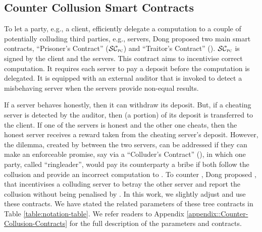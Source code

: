 \vspace{-3mm}

\subsection{Counter Collusion Smart Contracts}\label{Counter-Collusion-Smart-Contracts}
\vspace{-.5mm}

To let a party, e.g., a client, efficiently delegate a computation to a  couple of potentially colluding third parties, e.g., servers, Dong   \et \cite{dong2017betrayal} proposed two main smart contracts, ``Prisoner's Contract'' ($\SCpc$) and ``Traitor's Contract'' (\SCtc).  
%
$\SCpc$ is signed by the client and the servers. This contract aims to incentivise correct computation. It requires each server to pay a deposit before the computation is delegated. It is equipped with an external auditor that is invoked to detect a misbehaving server when the servers provide non-equal results. 



If a server behaves honestly, then it can withdraw its deposit. But, if a cheating server is detected by the auditor, then (a portion) of its deposit is transferred to the client. If one of the servers is honest and the other one cheats, then the honest server receives a reward taken from the cheating server's deposit. However, the dilemma, created by \SCpc between the two servers, can be addressed if they can make an enforceable promise, say via a ``Colluder's Contract'' (\SCcc),  in which one party, called ``ringleader'', would pay its counterparty a bribe if both follow the collusion and provide an incorrect computation to \SCpc. To counter \SCcc, Dong   \et proposed \SCtc, that incentivises a colluding server to betray the other server and report the collusion without being penalised by \SCpc. In this work, we slightly adjust and use these contracts. We have stated the related parameters of these tree contracts in Table \ref{table:notation-table}. We refer readers to Appendix \ref{appendix::Counter-Collusion-Contracts} for the full description of the parameters and contracts. 




